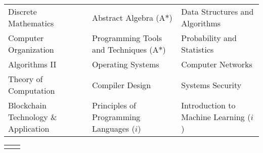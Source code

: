 

{\fontsize{10pt}{1.5em}\bodyfontlight\upshape\color{text}
  \setlength\extrarowheight{-3pt}
  \begin{tabular*}{\textwidth}{L{\textwidth/3} L{\textwidth/3} L{\textwidth/3}}
		Discrete Mathematics & Abstract Algebra (A$*$) & Data Structures and Algorithms \\
Computer Organization & Programming Tools and Techniques (A$*$) & Probability and Statistics \\
    Algorithms II & Operating Systems & Computer Networks \\
    Theory of Computation & Compiler Design & Systems Security \\
    Blockchain Technology \& Application & Principles of Programming Languages ($i$) & Introduction to Machine Learning ($i$) \\

\end{tabular*}

\fontsize{10pt}{1em}\footerfont\upshape\color{text}
\begin{tabular*}{\textwidth}{L{\textwidth/3 + 1cm} L{\textwidth/3}}
   & 
\end{tabular*}
\vspace{-1em}
}
